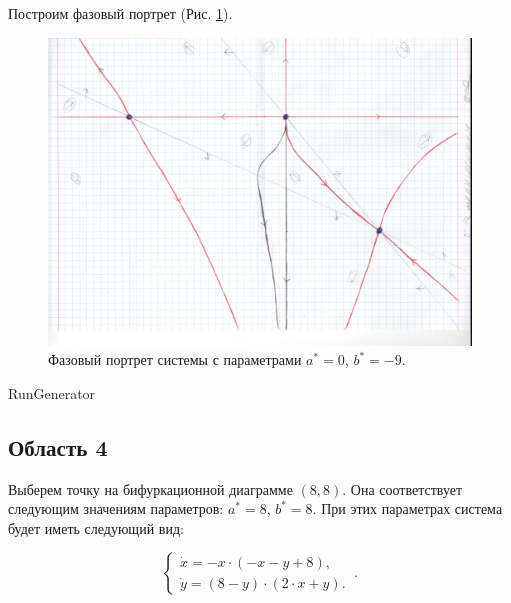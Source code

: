 Построим фазовый портрет (Рис. \ref{fig:phportr03}).
\begin{figure}[h]
	\includegraphics[width=\textwidth]{phptr/(0,-9) транскритическая).jpg}
	\centering
	\caption{\label{fig:phportr03} Фазовый портрет системы с параметрами $a^\ast = 0$, $b^\ast = -9$.}
\end{figure}

\newpage
RunGenerator
\newpage


\subsection{Область 4}

Выберем точку на бифуркационной диаграмме $(8, 8)$. Она соответствует следующим значениям параметров:  $a^\ast = 8$, $b^\ast = 8$. При этих параметрах система будет иметь следующий вид: 

$$
\left \lbrace 
\begin{matrix} 
	\dot{x} = -x \cdot (-x - y + 8), \\
	\dot{y} = (8 - y) \cdot (2 \cdot x + y). \
\end{matrix} 
\right . .$$

